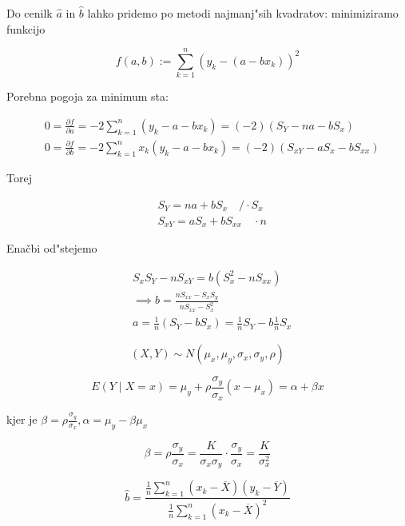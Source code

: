 \documentclass[a4paper,12pt]{article}
\theoremstyle{definition}
\theoremstyle{remark}
\begin{document}
Do cenilk $\hat{a}$ in $\hat{b}$ lahko pridemo po metodi najmanj"sih kvadratov: minimiziramo funkcijo

\begin{equation*}
    f(a,b) := \sum_{k=1}^{n} (y_k - (a - b x_k))^2
\end{equation*}

Porebna pogoja za minimum sta:

\begin{align*}
    &0 = \frac{\partial f}{\partial a} = -2 \sum_{k=1}^{n} (y_k - a - b x_k) = (-2) (S_Y - na - b S_x) \\
    &0 = \frac{\partial f}{\partial b} = -2 \sum_{k=1}^{n} x_k (y_k - a - b x_k) = (-2) (S_{xY} - a S_x - b S_{xx})
\end{align*}

Torej

\begin{align*}
    &S_Y = na + b S_x \quad / \cdot S_x \\
    &S_{xY} = a S_x + b S_{xx} \quad \cdot n
\end{align*}

Enačbi od"stejemo

\begin{align*}
    &S_x S_Y - n S_{xY} = b(S_x^2 - n S_{xx}) \\
    &\implies b = \frac{n S_{xx} - S_x S_y}{n S_{xx} - S_x^2} \\
    &a = \frac{1}{n} (S_Y - b S_x) = \frac{1}{n} S_Y - b \frac{1}{n} S_x
\end{align*}

\begin{equation*}
    (X,Y) \sim N(\mu_x, \mu_y, \sigma_x, \sigma_y, \rho)
\end{equation*}

\begin{equation*}
    E(Y \mid X = x) = \mu_y + \rho \frac{\sigma_y}{\sigma_x} (x - \mu_x) = \alpha + \beta x
\end{equation*}

kjer je $\beta = \rho \frac{\sigma_y}{\sigma_x}, \alpha = \mu_y - \beta \mu_x$

\begin{equation*}
    \beta = \rho \frac{\sigma_y}{\sigma_x} = \frac{K}{\sigma_x \sigma_y} \cdot \frac{\sigma_y}{\sigma_x} = \frac{K}{\sigma_x^2}
\end{equation*}

\begin{equation*}
    \hat{b} = \frac{\frac{1}{n} \sum_{k=1}^{n} (x_k - \overline{X}) (y_k - \overline{Y})}{\frac{1}{n} \sum_{k=1}^{n} (x_k - \overline{X})^2}
\end{equation*}
\end{document}
